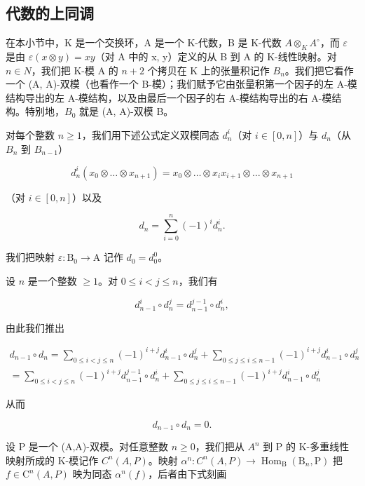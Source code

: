 \subsection{代数的上同调}

在本小节中，K 是一个交换环，A 是一个 K-代数，B 是 K-代数 \(A \otimes_{K} A^{\circ}\)，而 \(\varepsilon\) 是由 \(\varepsilon(x \otimes y) = xy\)（对 A 中的 x, y）定义的从 B 到 A 的 K-线性映射。对 \(n \in N\)，我们把 K-模 A 的 \(n + 2\) 个拷贝在 K 上的张量积记作 \(B_{n}\)。我们把它看作一个 (A, A)-双模（也看作一个 B-模）；我们赋予它由张量积第一个因子的左 A-模结构导出的左 A-模结构，以及由最后一个因子的右 A-模结构导出的右 A-模结构。特别地，\(B_{0}\) 就是 (A, A)-双模 B。

对每个整数 \(n \geqslant 1\)，我们用下述公式定义双模同态 \(d_{n}^{i}\)（对 \(i \in [0, n]\)）与 \(d_{n}\)（从 \(B_{n}\) 到 \(B_{n-1}\)）

\[
d _ {n} ^ {i} (x _ {0} \otimes \dots \otimes x _ {n + 1}) = x _ {0} \otimes \dots \otimes x _ {i} x _ {i + 1} \otimes \dots \otimes x _ {n + 1}\tag{4}
\]

（对 \(i\in [0,n]\)）以及

\[
d _ {n} = \sum_ {i = 0} ^ {n} (- 1) ^ {i} d _ {n} ^ {i}.\tag{5}
\]

我们把映射 \(\varepsilon : \mathrm{B}_0 \to \mathrm{A}\) 记作 \(d_0 = d_0^0\)。

设 \(n\) 是一个整数 \(\geqslant 1\)。对 \(0 \leqslant i < j \leqslant n\)，我们有

\[
d _ {n - 1} ^ {i} \circ d _ {n} ^ {j} = d _ {n - 1} ^ {j - 1} \circ d _ {n} ^ {i},\tag{6}
\]

由此我们推出

\[
\begin{array}{c} d _ {n - 1} \circ d _ {n} = \sum_ {0 \leqslant i <   j \leqslant n} (- 1) ^ {i + j} d _ {n - 1} ^ {i} \circ d _ {n} ^ {j} + \sum_ {0 \leqslant j \leqslant i \leqslant n - 1} (- 1) ^ {i + j} d _ {n - 1} ^ {i} \circ d _ {n} ^ {j} \\ = \sum_ {0 \leqslant i <   j \leqslant n} (- 1) ^ {i + j} d _ {n - 1} ^ {j - 1} \circ d _ {n} ^ {i} + \sum_ {0 \leqslant j \leqslant i \leqslant n - 1} (- 1) ^ {i + j} d _ {n - 1} ^ {i} \circ d _ {n} ^ {j} \end{array}
\]

从而

\[
d _ {n - 1} \circ d _ {n} = 0.\tag{7}
\]

设 P 是一个 (A,A)-双模。对任意整数 \(n \geqslant 0\)，我们把从 \(A^{n}\) 到 P 的 K-多重线性映射所成的 K-模记作 \(C^{n}(A,P)\)。映射 \(\alpha^{n}: C^{n}(A,P) \to \operatorname{Hom}_{\mathrm{B}}(\mathrm{B}_{n},\mathrm{P})\) 把 \(f \in \mathrm{C}^{n}(A,P)\) 映为同态 \(\alpha^{n}(f)\)，后者由下式刻画


